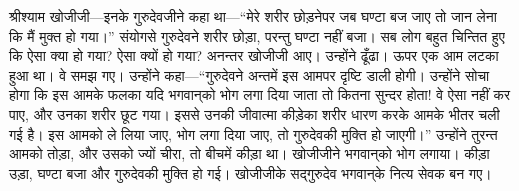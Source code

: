 \begin{sloppypar}\justifying{}
श्रीश्याम खोजीजी—इनके गुरुदेवजीने कहा था—“मेरे शरीर छोड़नेपर जब घण्टा बज जाए तो जान लेना कि मैं मुक्त हो गया।” संयोगसे गुरुदेवने शरीर छोड़ा, परन्तु घण्टा नहीं बजा। सब लोग बहुत चिन्तित हुए कि ऐसा क्या हो गया? ऐसा क्यों हो गया? अनन्तर खोजीजी आए। उन्होंने ढूँढा। ऊपर एक आम लटका हुआ था। वे समझ गए। उन्होंने कहा—“गुरुदेवने अन्तमें इस आमपर दृष्टि डाली होगी। उन्होंने सोचा होगा कि इस आमके फलका यदि भगवान्‌को भोग लगा दिया जाता तो कितना सुन्दर होता! वे ऐसा नहीं कर पाए, और उनका शरीर छूट गया। इससे उनकी जीवात्मा कीड़ेका शरीर धारण करके आमके भीतर चली गई है। इस आमको ले लिया जाए, भोग लगा दिया जाए, तो गुरुदेवकी मुक्ति हो जाएगी।” उन्होंने तुरन्त आमको तोड़ा, और उसको ज्यों चीरा, तो बीचमें कीड़ा था। खोजीजीने भगवान्‌को भोग लगाया। कीड़ा उड़ा, घण्टा बजा और गुरुदेवकी मुक्ति हो गई। खोजीजीके सद्गुरुदेव भगवान्‌के नित्य सेवक बन गए।
\end{sloppypar}



